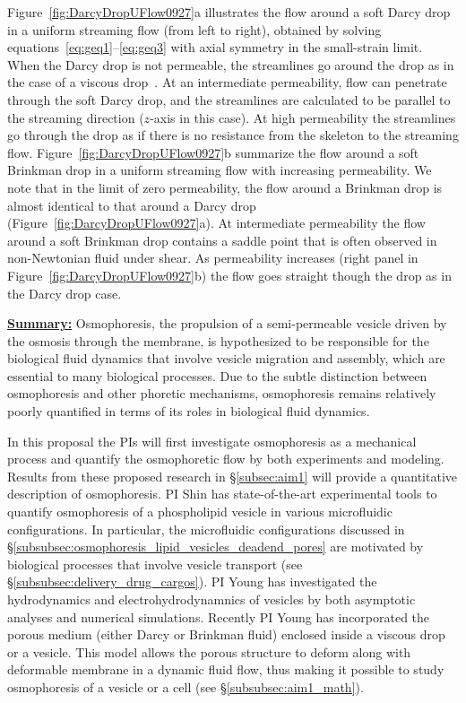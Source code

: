 \documentclass[11pt]{article}
\begin{document}
%
Figure~\ref{fig:DarcyDropUFlow0927}a illustrates the flow around a soft
Darcy drop in a uniform streaming flow (from left to right), obtained by
solving equations~\eqref{eq:geq1}--\eqref{eq:geq3} with axial symmetry
in the small-strain limit. When the Darcy drop is not permeable, the
streamlines go around the drop as in the case of a viscous
drop~\cite{DavisStone1993_CES, GLeal_AdvancedTransportPhenomena}. At an
intermediate permeability, flow can penetrate through the soft Darcy
drop, and the streamlines are calculated to be parallel to the streaming
direction ($z$-axis in this case). At high permeability the streamlines
go through the drop as if there is no resistance from the skeleton to
the streaming flow.  Figure~\ref{fig:DarcyDropUFlow0927}b summarize the
flow around a soft Brinkman drop in a uniform streaming flow with
increasing permeability.  We note that in the limit of zero
permeability, the flow around a Brinkman drop is almost identical to
that around a Darcy drop (Figure~\ref{fig:DarcyDropUFlow0927}a).  At
intermediate permeability the flow around a soft Brinkman drop contains
a saddle point that is often observed in non-Newtonian fluid under
shear.  As permeability increases (right panel in
Figure~\ref{fig:DarcyDropUFlow0927}b) the flow goes straight though the
drop as in the Darcy drop case.

\noindent
\underline{{\bf Summary:}}
Osmophoresis, the propulsion of a semi-permeable vesicle driven by the
osmosis through the membrane, is hypothesized to be responsible for the
biological fluid dynamics that involve vesicle migration and assembly,
which are essential to many biological processes.  Due to the subtle
distinction between osmophoresis and other phoretic mechanisms,
osmophoresis remains relatively poorly quantified in terms of its roles
in biological fluid dynamics. 

In this proposal the PIs will first investigate osmophoresis as a
mechanical process and quantify the osmophoretic flow by both
experiments and modeling.  Results from these proposed research in
\S\ref{subsec:aim1} will provide a quantitative description of
osmophoresis.  PI Shin has state-of-the-art experimental tools to
quantify osmophoresis of a phospholipid vesicle in various microfluidic
configurations.  In particular, the microfluidic configurations
discussed in \S\ref{subsubsec:osmophoresis_lipid_vesicles_deadend_pores}
are motivated by biological processes that involve vesicle transport
(see \S\ref{subsubsec:delivery_drug_cargos}).  PI Young has investigated
the hydrodynamics and electrohydrodynamnics of vesicles by both
asymptotic analyses and numerical simulations. Recently PI Young has
incorporated the porous medium (either Darcy or Brinkman fluid) enclosed
inside a viscous drop or a vesicle.  This model allows the porous
structure to deform along with deformable membrane in a dynamic fluid
flow, thus making it possible to study osmophoresis of a vesicle or a
cell (see \S\ref{subsubsec:aim1_math}). 
\end{document}
